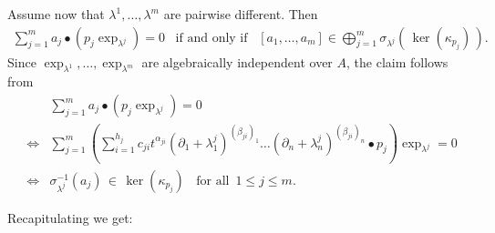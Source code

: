 \documentclass[a4paper,10pt]{article}
\theoremstyle{nonumberplain}
\begin{document}
Assume now that $\lambda^1, \dots, \lambda^m$ are pairwise different. Then 
\begin{eqnarray}\label{pwverschieden}
\sum_{j=1}^m a_j \bullet (p_j \exp_{\lambda^j}) =0 \;\;\; \mbox{if and only if}\;\;\;[a_1, \dots, a_m] \in 
\bigoplus_{j=1}^m \sigma_{\lambda^j}(\,\ker(\kappa_{p_j})  \,).
\end{eqnarray}
Since $\exp_{\lambda^1}, \dots,\exp_{\lambda^m} $ are algebraically independent over $A$, the claim follows from
\begin{eqnarray*}
& &\sum_{j=1}^m a_j \bullet (p_j \exp_{\lambda^j}) = 0 \\  
&\Leftrightarrow& \sum_{j=1}^m \left( \sum_{i=1}^{h_j} c_{ji} t^{\alpha_{ji}} (\partial_1 + \lambda^j_1)^{(\beta_{ji})_1} \dots
 (\partial_n + \lambda^j_n)^{(\beta_{ji})_n} \bullet p_j \right) \exp_{\lambda^j} = 0 \\
&\Leftrightarrow&\sigma_{\lambda^j}^{-1}(a_j) \, \in \, \ker(\kappa_{p_j}) \;\; \mbox{ for all } \, 1 \leq j \leq m.
\end{eqnarray*}

Recapitulating we get:
\end{document}
